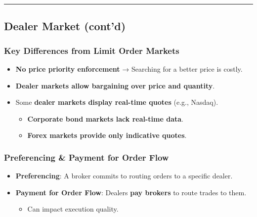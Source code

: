 \documentclass[
  letterpaper,
  DIV=11,
  numbers=noendperiod]{scrartcl}
\providecommand{\tightlist}{%
  \setlength{\itemsep}{0pt}\setlength{\parskip}{0pt}}\usepackage{longtable,booktabs,array}
\begin{document}
\begin{center}\rule{0.5\linewidth}{0.5pt}\end{center}

\subsection{Dealer Market (cont'd)}\label{dealer-market-contd}

\subsubsection{\texorpdfstring{\textbf{Key Differences from Limit Order
Markets}}{Key Differences from Limit Order Markets}}\label{key-differences-from-limit-order-markets}

\begin{itemize}
\tightlist
\item
  \textbf{No price priority enforcement} → Searching for a better price
  is costly.
\item
  \textbf{Dealer markets allow bargaining over price and quantity}.
\item
  Some \textbf{dealer markets display real-time quotes} (e.g., Nasdaq).

  \begin{itemize}
  \tightlist
  \item
    \textbf{Corporate bond markets lack real-time data}.
  \item
    \textbf{Forex markets provide only indicative quotes}.
  \end{itemize}
\end{itemize}

\subsubsection{\texorpdfstring{\textbf{Preferencing \& Payment for Order
Flow}}{Preferencing \& Payment for Order Flow}}\label{preferencing-payment-for-order-flow}

\begin{itemize}
\tightlist
\item
  \textbf{Preferencing}: A broker commits to routing orders to a
  specific dealer.
\item
  \textbf{Payment for Order Flow}: Dealers \textbf{pay brokers} to route
  trades to them.

  \begin{itemize}
  \tightlist
  \item
    Can impact execution quality.
  \end{itemize}
\end{itemize}
\end{document}
